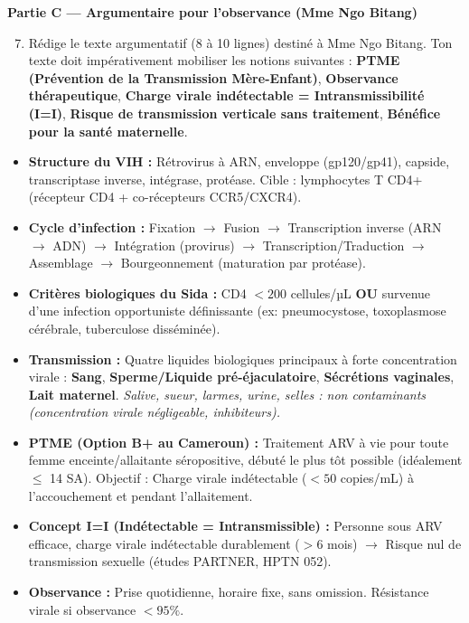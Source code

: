 \documentclass[11pt]{article}
\begin{document}
\textbf{Partie C — Argumentaire pour l'observance (Mme Ngo Bitang)}
\begin{enumerate}
    \setcounter{enumi}{6}
    \item Rédige le texte argumentatif (8 à 10 lignes) destiné à Mme Ngo Bitang. Ton texte doit impérativement mobiliser les notions suivantes : \textbf{PTME (Prévention de la Transmission Mère-Enfant)}, \textbf{Observance thérapeutique}, \textbf{Charge virale indétectable = Intransmissibilité (I=I)}, \textbf{Risque de transmission verticale sans traitement}, \textbf{Bénéfice pour la santé maternelle}.
\end{enumerate}

\begin{aretenir}
\begin{itemize}
    \item \textbf{Structure du VIH :} Rétrovirus à ARN, enveloppe (gp120/gp41), capside, transcriptase inverse, intégrase, protéase. Cible : lymphocytes T CD4+ (récepteur CD4 + co-récepteurs CCR5/CXCR4).
    \item \textbf{Cycle d'infection :} Fixation $\rightarrow$ Fusion $\rightarrow$ Transcription inverse (ARN $\rightarrow$ ADN) $\rightarrow$ Intégration (provirus) $\rightarrow$ Transcription/Traduction $\rightarrow$ Assemblage $\rightarrow$ Bourgeonnement (maturation par protéase).
    \item \textbf{Critères biologiques du Sida :} CD4 $< 200$ cellules/µL \textbf{OU} survenue d'une infection opportuniste définissante (ex: pneumocystose, toxoplasmose cérébrale, tuberculose disséminée).
    \item \textbf{Transmission :} Quatre liquides biologiques principaux à forte concentration virale : \textbf{Sang}, \textbf{Sperme/Liquide pré-éjaculatoire}, \textbf{Sécrétions vaginales}, \textbf{Lait maternel}. \emph{Salive, sueur, larmes, urine, selles : non contaminants (concentration virale négligeable, inhibiteurs).}
    \item \textbf{PTME (Option B+ au Cameroun) :} Traitement ARV à vie pour toute femme enceinte/allaitante séropositive, débuté le plus tôt possible (idéalement $\le$ 14 SA). Objectif : Charge virale indétectable ($< 50$ copies/mL) à l'accouchement et pendant l'allaitement.
    \item \textbf{Concept I=I (Indétectable = Intransmissible) :} Personne sous ARV efficace, charge virale indétectable durablement ($> 6$ mois) $\rightarrow$ Risque nul de transmission sexuelle (études PARTNER, HPTN 052).
    \item \textbf{Observance :} Prise quotidienne, horaire fixe, sans omission. Résistance virale si observance $< 95\%$.
\end{itemize}
\end{aretenir}
\end{document}
